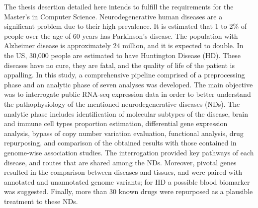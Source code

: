 The thesis desertion detailed here intends to fulfill the requirements for the Master’s in Computer Science. Neurodegenerative human diseases are a significant problem due to their high prevalence. It is estimated that 1 to 2\% of people over the age of 60 years has Parkinson’s disease. The population with Alzheimer disease is approximately 24 million, and it is expected to double. In the US, 30,000 people are estimated to have Huntington Disease (HD). These diseases have no cure, they are fatal, and the quality of life of the patient is appalling. In this study, a comprehensive pipeline comprised of a preprocessing phase and an analytic phase of seven analyses was developed. The main objective was to interrogate public RNA-seq expression data in order to better understand the pathophysiology of the mentioned neurodegenerative diseases (NDs). The analytic phase includes identification of molecular subtypes of the disease, brain and immune cell types proportion estimation, differential gene expression analysis, bypass of copy number variation evaluation, functional analysis, drug repurposing, and comparison of the obtained results with those contained in genome-wise association studies. The interrogation provided key pathways of each disease, and routes that are shared among the NDs. Moreover, pivotal genes resulted in the comparison between diseases and tissues, and were paired with annotated and unannotated genome variants; for HD a possible blood biomarker was suggested. Finally, more than 30 known drugs were repurposed as a plausible treatment to these NDs.